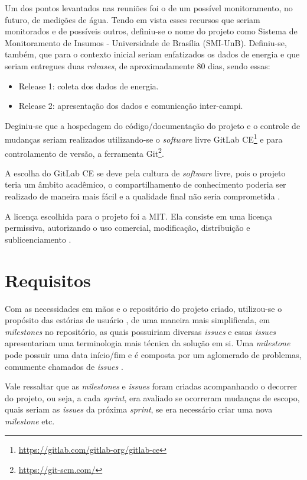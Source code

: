 Um dos pontos levantados nas reuniões foi o de um possível monitoramento, no futuro, de medições de água. Tendo em vista esses recursos que seriam monitorados e de possíveis outros, definiu-se o nome do projeto como Sistema de Monitoramento de Insumos - Universidade de Brasília (SMI-UnB). Definiu-se, também, que para o contexto inicial seriam enfatizados os dados de energia e que seriam entregues duas \textit{releases}, de aproximadamente 80 dias, sendo essas:

\begin{itemize}
    \item Release 1: coleta dos dados de energia.
    \item Release 2: apresentação dos dados e comunicação inter-campi.
\end{itemize}

Deginiu-se que a hospedagem do código/documentação do projeto e o controle de mudanças seriam realizados utilizando-se o \textit{software} livre GitLab CE\footnote{\url{https://gitlab.com/gitlab-org/gitlab-ce}} e para controlamento de versão, a ferramenta Git\footnote{\url{https://git-scm.com/}}.

A escolha do GitLab CE se deve pela cultura de \textit{software} livre, pois o projeto teria um âmbito acadêmico, o compartilhamento de conhecimento poderia ser realizado de maneira mais fácil e a qualidade final não seria comprometida \cite{raymond1999}.

A licença escolhida para o projeto foi a MIT. Ela consiste em uma licença permissiva, autorizando o uso comercial, modificação, distribuição e sublicenciamento \cite{mit_license}.

\section{Requisitos}
Com as necessidades em mãos e o repositório do projeto criado, utilizou-se o propósito das estórias de usuário \cite{beck_2004}, de uma maneira mais simplificada, em \textit{milestones} no repositório, as quais possuiriam diversas \textit{issues} e essas \textit{issues} apresentariam uma terminologia mais técnica da solução em si. Uma \textit{milestone} pode possuir uma data início/fim e é composta por um aglomerado de problemas, comumente chamados de \textit{issues} \cite{gitlab}.

Vale ressaltar que as \textit{milestones} e \textit{issues} foram criadas acompanhando o decorrer do projeto, ou seja, a cada \textit{sprint}, era avaliado se ocorreram mudanças de escopo, quais seriam as \textit{issues} da próxima \textit{sprint}, se era necessário criar uma nova \textit{milestone} etc.

